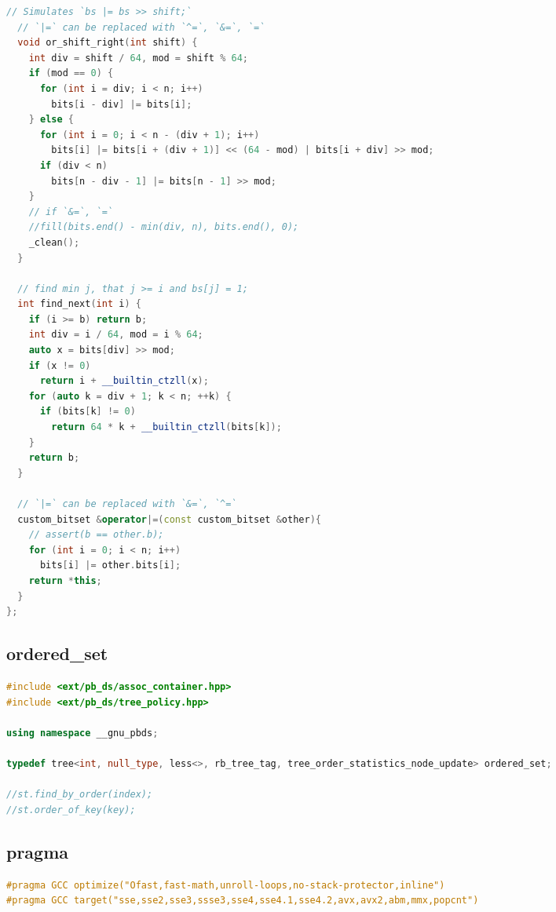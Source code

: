\documentclass[9pt,a4paper,landscape,twosided]{extarticle}
\begin{document}
\begin{multicols*}{3}
\begin{lstlisting}[language=C++]
  // Simulates `bs |= bs >> shift;`
  // `|=` can be replaced with `^=`, `&=`, `=`
  void or_shift_right(int shift) {
    int div = shift / 64, mod = shift % 64;
    if (mod == 0) {
      for (int i = div; i < n; i++)
        bits[i - div] |= bits[i];
    } else {
      for (int i = 0; i < n - (div + 1); i++)
        bits[i] |= bits[i + (div + 1)] << (64 - mod) | bits[i + div] >> mod;
      if (div < n)
        bits[n - div - 1] |= bits[n - 1] >> mod;
    }
    // if `&=`, `=`
    //fill(bits.end() - min(div, n), bits.end(), 0);
    _clean();
  }

  // find min j, that j >= i and bs[j] = 1;
  int find_next(int i) {
    if (i >= b) return b;
    int div = i / 64, mod = i % 64;
    auto x = bits[div] >> mod;
    if (x != 0)
      return i + __builtin_ctzll(x);
    for (auto k = div + 1; k < n; ++k) {
      if (bits[k] != 0)
        return 64 * k + __builtin_ctzll(bits[k]);
    }
    return b;
  }

  // `|=` can be replaced with `&=`, `^=`
  custom_bitset &operator|=(const custom_bitset &other){
    // assert(b == other.b);
    for (int i = 0; i < n; i++)
      bits[i] |= other.bits[i];
    return *this;
  }
};
\end{lstlisting}

\subsection{ordered\_set}
\begin{lstlisting}[language=C++]
#include <ext/pb_ds/assoc_container.hpp>
#include <ext/pb_ds/tree_policy.hpp>

using namespace __gnu_pbds;

typedef tree<int, null_type, less<>, rb_tree_tag, tree_order_statistics_node_update> ordered_set;

//st.find_by_order(index);
//st.order_of_key(key);

\end{lstlisting}

\subsection{pragma}
\begin{lstlisting}[language=C++]
#pragma GCC optimize("Ofast,fast-math,unroll-loops,no-stack-protector,inline")
#pragma GCC target("sse,sse2,sse3,ssse3,sse4,sse4.1,sse4.2,avx,avx2,abm,mmx,popcnt")

\end{lstlisting}


\end{multicols*}
\end{document}
